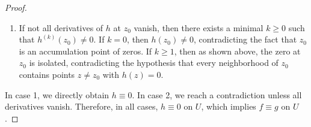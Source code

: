 \begin{proof}
\begin{enumerate}
    \item If not all derivatives of $h$ at $z_0$ vanish, then there exists a minimal $k \geq 0$ such that $h^{(k)}(z_0) \neq 0$. If $k = 0$, then $h(z_0) \neq 0$, contradicting the fact that $z_0$ is an accumulation point of zeros. If $k \geq 1$, then as shown above, the zero at $z_0$ is isolated, contradicting the hypothesis that every neighborhood of $z_0$ contains points $z \neq z_0$ with $h(z) = 0$.
\end{enumerate}

In case 1, we directly obtain $h \equiv 0$. In case 2, we reach a contradiction unless all derivatives vanish. Therefore, in all cases, $h \equiv 0$ on $U$, which implies $f \equiv g$ on $U$.
\end{proof}
